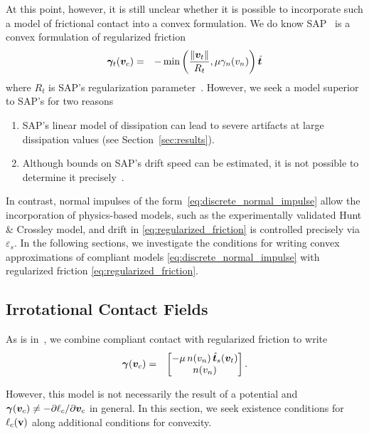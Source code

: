 At this point, however, it is still unclear whether it is possible to incorporate such a
model of frictional contact into a convex formulation. We do know
SAP~\cite{bib:castro2022unconstrained} is a convex formulation of regularized friction
\begin{eqnarray}
    \bgamma_t(\vf{v}_c) &=& -\min\left(\frac{\Vert\vf{v}_t\Vert}{R_t}, \mu\gamma_n(v_n)\right)\hat{\vf{t}}
    \label{eq:sap_friction_regularization}
\end{eqnarray}
where $R_t$ is SAP's regularization parameter~\cite{bib:castro2022unconstrained}.
However, we seek a model superior to SAP's for two reasons
\begin{enumerate}
    \item SAP's linear model of dissipation can lead to severe artifacts at
    large dissipation values (see Section~\ref{sec:results}).
    \item  Although bounds on SAP's drift speed can be estimated, it is not possible to determine
    it precisely~\cite{bib:castro2022unconstrained}.
\end{enumerate}

In contrast, normal impulses of the form~\eqref{eq:discrete_normal_impulse}
allow the incorporation of physics-based models, such as the experimentally
validated Hunt \& Crossley model, and drift in \eqref{eq:regularized_friction}
is controlled precisely via $\varepsilon_s$. In the following sections, we
investigate the conditions for writing convex approximations of compliant models
\eqref{eq:discrete_normal_impulse} with regularized friction
\eqref{eq:regularized_friction}.

\subsection{Irrotational Contact Fields}

As is in~\cite{bib:castro2020}, we combine compliant contact with regularized
friction to write
\begin{eqnarray}
	\bgamma(\vf{v}_c) &=&
	\begin{bmatrix}
		-\mu\,n(v_n)\,\hat{\vf{t}}_s(\vf{v}_t)\\
		n(v_n)
	\end{bmatrix}.
    \label{eq:total_impulse}
\end{eqnarray}

However, this model is not necessarily the result of a potential and ${\bm\gamma}({\bm{v}}_{c})
\ne -\partial\ell_{c}/\partial{\bm{v}}_{c}$ in general. In this section, we seek existence
conditions for $\ell_c({\mathbf{v}})$ along additional conditions for convexity.

